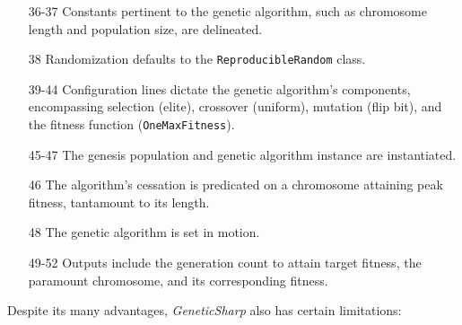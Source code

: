 \begin{enumerate}
\begin{enumerate}
      \end{enumerate}
    \item[36-37] Constants pertinent to the genetic algorithm, such as 
      chromosome length and population size, are delineated.
    \item[38] Randomization defaults to the \texttt{ReproducibleRandom} class.
    \item[39-44] Configuration lines dictate the genetic algorithm's components, 
      encompassing selection (elite), crossover (uniform), mutation (flip bit), 
      and the fitness function (\texttt{OneMaxFitness}).
    \item[45-47] The genesis population and genetic algorithm instance are 
      instantiated.
    \item[46] The algorithm's cessation is predicated on a chromosome attaining 
      peak fitness, tantamount to its length.
    \item[48] The genetic algorithm is set in motion.
    \item[49-52] Outputs include the generation count to attain target fitness, 
      the paramount chromosome, and its corresponding fitness.
  \end{enumerate}

  Despite its many advantages, \textit{GeneticSharp} also has certain 
  limitations:

